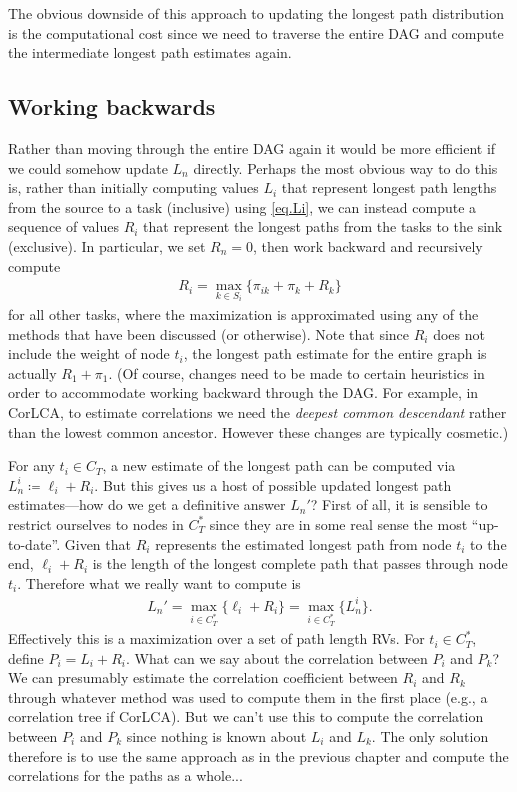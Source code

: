 \documentclass[12pt]{article}
\begin{document}
The obvious downside of this approach to updating the longest path distribution is the computational cost since we need to traverse the entire DAG and compute the intermediate longest path estimates again.  


\subsection{Working backwards}
\label{subsect.updating_backwards}

Rather than moving through the entire DAG again it would be more efficient if we could somehow update $L_n$ directly. Perhaps the most obvious way to do this is, rather than initially computing values $L_i$ that represent longest path lengths from the source to a task (inclusive) using \eqref{eq.Li}, we can instead compute a sequence of values $R_i$ that represent the longest paths from the tasks to the sink (exclusive). In particular, we set $R_n = 0$, then work backward and recursively compute  
\begin{align*}
  R_i = \max_{k \in S_i} \{ \pi_{ik} + \pi_k + R_k  \}
\end{align*}
for all other tasks, where the maximization is approximated using any of the methods that have been discussed (or otherwise). Note that since $R_i$ does not include the weight of node $t_i$, the longest path estimate for the entire graph is actually $R_1 + \pi_1$. (Of course, changes need to be made to certain heuristics in order to accommodate working backward through the DAG. For example, in CorLCA, to estimate correlations we need the {\em deepest common descendant} rather than the lowest common ancestor. However these changes are typically cosmetic.)

For any $t_i \in C_T$, a new estimate of the longest path can be computed via $L_n^i \coloneqq \ell_i + R_i$. But this gives us a host of possible updated longest path estimates---how do we get a definitive answer $L_n'$? First of all, it is sensible to restrict ourselves to nodes in $C_T^*$ since they are in some real sense the most ``up-to-date''. Given that $R_i$ represents the estimated longest path from node $t_i$ to the end, $\ell_i + R_i$ is the length of the longest complete path that passes through node $t_i$. Therefore what we really want to compute is       
\begin{align*}
  L_n' = \max_{i \in C_T^*} \{ \ell_i + R_i  \} = \max_{i \in C_T^*} \{ L_n^i  \}.
\end{align*}
Effectively this is a maximization over a set of path length RVs. For $t_i \in C_T^*$, define $P_i = L_i + R_i$. What can we say about the correlation between $P_i$ and $P_k$?  We can presumably estimate the correlation coefficient between $R_i$ and $R_k$ through whatever method was used to compute them in the first place (e.g., a correlation tree if CorLCA). But we can't use this to compute the correlation between $P_i$ and $P_k$ since nothing is known about $L_i$ and $L_k$. The only solution therefore is to use the same approach as in the previous chapter and compute the correlations for the paths as a whole...
\end{document}
